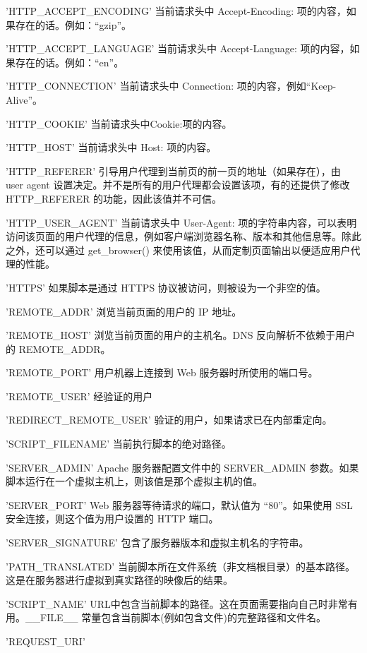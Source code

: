 \begin{compactitem}
\item 'HTTP\_ACCEPT\_ENCODING'
当前请求头中 Accept-Encoding: 项的内容，如果存在的话。例如：“gzip”。
\item 'HTTP\_ACCEPT\_LANGUAGE'
当前请求头中 Accept-Language: 项的内容，如果存在的话。例如：“en”。
\item 'HTTP\_CONNECTION'
当前请求头中 Connection: 项的内容，例如“Keep-Alive”。
\item 'HTTP\_COOKIE'
当前请求头中Cookie:项的内容。
\item 'HTTP\_HOST'
当前请求头中 Host: 项的内容。
\item 'HTTP\_REFERER'
引导用户代理到当前页的前一页的地址（如果存在），由 user agent 设置决定。并不是所有的用户代理都会设置该项，有的还提供了修改 HTTP\_REFERER 的功能，因此该值并不可信。
\item 'HTTP\_USER\_AGENT'
当前请求头中 User-Agent: 项的字符串内容，可以表明访问该页面的用户代理的信息，例如客户端浏览器名称、版本和其他信息等。除此之外，还可以通过 get\_browser() 来使用该值，从而定制页面输出以便适应用户代理的性能。
\item 'HTTPS'
如果脚本是通过 HTTPS 协议被访问，则被设为一个非空的值。
\item 'REMOTE\_ADDR'
浏览当前页面的用户的 IP 地址。
\item 'REMOTE\_HOST'
浏览当前页面的用户的主机名。DNS 反向解析不依赖于用户的 REMOTE\_ADDR。
\item 'REMOTE\_PORT'
用户机器上连接到 Web 服务器时所使用的端口号。
\item 'REMOTE\_USER'
经验证的用户
\item 'REDIRECT\_REMOTE\_USER'
验证的用户，如果请求已在内部重定向。
\item 'SCRIPT\_FILENAME'
当前执行脚本的绝对路径。
\item 'SERVER\_ADMIN'
Apache 服务器配置文件中的 SERVER\_ADMIN 参数。如果脚本运行在一个虚拟主机上，则该值是那个虚拟主机的值。
\item 'SERVER\_PORT'
Web 服务器等待请求的端口，默认值为 “80”。如果使用 SSL 安全连接，则这个值为用户设置的 HTTP 端口。
\item 'SERVER\_SIGNATURE'
包含了服务器版本和虚拟主机名的字符串。
\item 'PATH\_TRANSLATED'
当前脚本所在文件系统（非文档根目录）的基本路径。这是在服务器进行虚拟到真实路径的映像后的结果。
\item 'SCRIPT\_NAME'
URL中包含当前脚本的路径。这在页面需要指向自己时非常有用。\_\_FILE\_\_ 常量包含当前脚本(例如包含文件)的完整路径和文件名。
\item 'REQUEST\_URI'

\end{compactitem}
